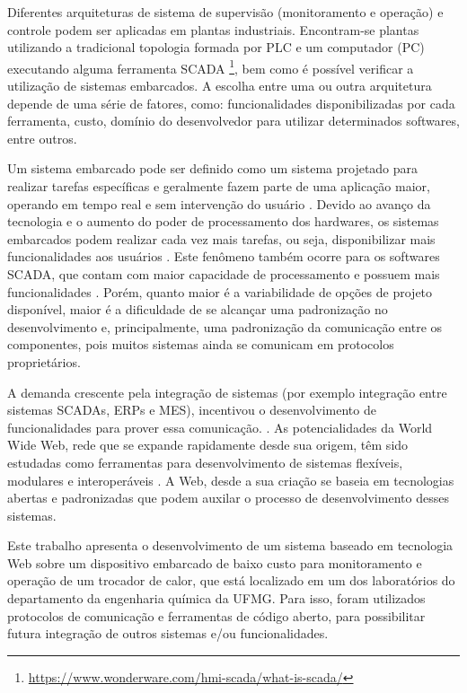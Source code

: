 	Diferentes arquiteturas de sistema de supervisão (monitoramento e operação) e controle podem ser aplicadas em plantas industriais. Encontram-se plantas utilizando a tradicional topologia formada por PLC e um computador (PC) executando alguma ferramenta SCADA \footnote{\url{https://www.wonderware.com/hmi-scada/what-is-scada/}}, bem como é possível verificar a utilização de sistemas embarcados. A escolha entre uma ou outra arquitetura depende de uma série de fatores, como: funcionalidades disponibilizadas por cada ferramenta, custo, domínio do desenvolvedor para utilizar determinados softwares, entre outros.
	
	Um sistema embarcado pode ser definido como um sistema projetado para realizar tarefas específicas e geralmente fazem parte de uma aplicação maior, operando em tempo real e sem intervenção do usuário \cite{baskiyar2005}.  Devido ao avanço da tecnologia e o aumento do poder de processamento dos hardwares, os sistemas embarcados podem realizar cada vez mais tarefas, ou seja, disponibilizar mais funcionalidades aos usuários \cite{luiz2011}. Este fenômeno também ocorre para os softwares SCADA, que contam com maior capacidade de processamento e possuem mais funcionalidades \cite{david2017}. Porém, quanto maior é a variabilidade de opções de projeto disponível, maior é a dificuldade de se alcançar uma padronização no desenvolvimento e, principalmente, uma padronização da comunicação entre os componentes, pois muitos sistemas ainda se comunicam em protocolos proprietários.
	
	A demanda crescente pela integração de sistemas (por exemplo integração entre sistemas SCADAs, ERPs e MES), incentivou o desenvolvimento de funcionalidades para prover essa comunicação. \cite{pablo2011,lucena2013}. As potencialidades da World Wide Web, rede que se expande rapidamente desde sua origem, têm sido estudadas como ferramentas para desenvolvimento de sistemas flexíveis, modulares e interoperáveis . A Web, desde a sua criação se baseia em tecnologias abertas e padronizadas que podem auxilar o processo de desenvolvimento desses sistemas.
	
	Este trabalho apresenta o desenvolvimento de um sistema baseado em tecnologia Web sobre um dispositivo embarcado de baixo custo para monitoramento e operação de um trocador de calor, que está localizado em um dos laboratórios do departamento da engenharia química da UFMG. Para isso, foram utilizados protocolos de comunicação e ferramentas de código aberto, para possibilitar futura integração de outros sistemas e/ou funcionalidades.
	
